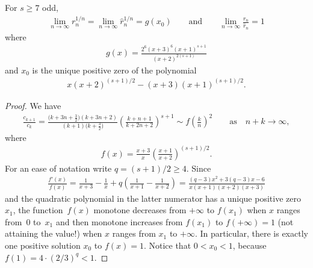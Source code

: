 \documentclass[pdftex]{sigma}
\begin{document}
\begin{lemma}\label{l4} For $s\ge7$ odd,
\begin{gather*}
\lim_{n\to\infty}r_n^{1/n}=\lim_{n\to\infty}\hat r_n^{1/n}=g(x_0)
\qquad\text{and}\qquad \lim_{n\to\infty}\frac{r_n}{\hat r_n}=1
\end{gather*}
where
\begin{gather*}
g(x)=\frac{2^6(x+3)^6(x+1)^{s+1}}{(x+2)^{2(s+1)}}
\end{gather*}
and $x_0$ is the unique positive zero of the polynomial
\begin{gather*}
x(x+2)^{(s+1)/2}-(x+3)(x+1)^{(s+1)/2}.
\end{gather*}
\end{lemma}

\begin{proof}We have
\begin{gather}
\frac{c_{k+1}}{c_k} =\frac{\big(k+3n+\frac32\big)(k+3n+2)}{(k+1)\big(k+\frac32\big)} \left(\frac{k+n+1}{k+2n+2}\right)^{s+1} \sim f\left(\frac kn\right)^2 \qquad\text{as}\quad n+k\to\infty, \label{e11}
\end{gather}
where
\begin{gather*}
f(x)=\frac{x+3}{x}\left(\frac{x+1}{x+2}\right)^{(s+1)/2}.
\end{gather*}
For an ease of notation write $q=(s+1)/2\ge4$. Since
\begin{gather*}
\frac{f'(x)}{f(x)}=\frac1{x+3}-\frac1x+q\left(\frac1{x+1}-\frac1{x+2}\right) =\frac{(q-3)x^2+3(q-3)x-6}{x(x+1)(x+2)(x+3)}
\end{gather*}
and the quadratic polynomial in the latter numerator has a unique positive zero $x_1$, the func\-tion~$f(x)$ monotone decreases from $+\infty$ to $f(x_1)$ when $x$ ranges from~$0$ to~$x_1$ and then monotone increases from $f(x_1)$ to $f(+\infty)=1$ (not attaining the value!) when $x$ ranges from $x_1$ to $+\infty$. In particular, there is exactly one positive solution $x_0$ to $f(x)=1$. Notice that $0<x_0<1$, because $f(1)=4\cdot(2/3)^q<1$.


\end{proof}
\end{document}
